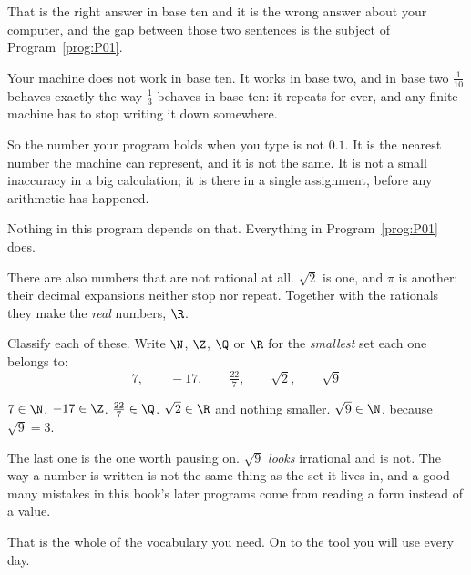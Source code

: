 \begin{fr}
That is the right answer in base ten and it is the wrong answer about your
computer, and the gap between those two sentences is the subject of
Program~\ref{prog:P01}.

\begin{trapbox}
Your machine does not work in base ten. It works in base two, and in base two
$\tfrac{1}{10}$ behaves exactly the way $\tfrac{1}{3}$ behaves in base ten: it
repeats for ever, and any finite machine has to stop writing it down somewhere.

So the number your program holds when you type  is not $\num{0.1}$.
It is the nearest number the machine can represent, and it is not the same. It
is not a small inaccuracy in a big calculation; it is there in a single
assignment, before any arithmetic has happened.

Nothing in this program depends on that. Everything in
Program~\ref{prog:P01} does.
\end{trapbox}

There are also numbers that are not rational at all. $\sqrt{2}$ is one, and
$\pi$ is another: their decimal expansions neither stop nor repeat. Together
with the rationals they make the \emph{real} numbers, $\R$.
\end{fr}


\begin{fr}
Classify each of these. Write $\N$, $\Z$, $\Q$ or $\R$ for the \emph{smallest}
set each one belongs to:
\[ 7, \qquad -17, \qquad \tfrac{22}{7}, \qquad \sqrt{2}, \qquad \sqrt{9} \]
\dotline
\nextframe
\end{fr}

\begin{fr}
\begin{ansblock}
$7 \in \N$. \quad $-17 \in \Z$. \quad $\tfrac{22}{7} \in \Q$. \quad
$\sqrt{2} \in \R$ and nothing smaller. \quad $\sqrt{9} \in \N$, because
$\sqrt{9} = 3$.

The last one is the one worth pausing on. $\sqrt{9}$ \emph{looks} irrational
and is not. The way a number is written is not the same thing as the set it
lives in, and a good many mistakes in this book's later programs come from
reading a form instead of a value.
\end{ansblock}

That is the whole of the vocabulary you need. On to the tool you will use
every day.
\end{fr}

